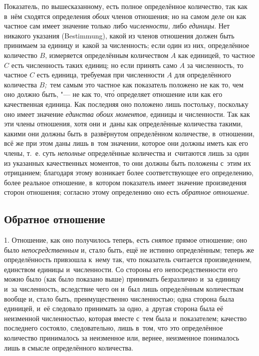 Показатель, по вышесказанному, есть полное определённое количество, так как
в~нём сходятся определения {\em обоих} членов отношения; но на самом деле он
как частное сам имеет значение только либо {\em численности,} либо
{\em единицы}. Нет никакого указания (Bestimmung), какой из членов отношения
должен быть принимаем за единицу и~какой за численность; если один из них,
определённое количество $B$, измеряется определённым количеством $A$ как
единицей, то частное $C$ есть численность таких единиц; но если принять само
$A$ за численность, то частное $C$ есть единица, требуемая при численности $A$
для определённого количества $B${\em ;\,} тем самым это частное как показатель
положено не как то, чем оно должно быть, "--- не как то, чт\'{о} определяет
отношение или как его качественная единица. Как последняя оно положено лишь
постольку, поскольку оно имеет значение {\em единства обоих моментов,} единицы
и численности. Так как эти члены отношения, хотя они и~даны как определённые
количества такими, какими они должны быть в~развёрнутом определённом
количестве, в~отношении, всё же при этом даны лишь в~том значении, которое они
должны иметь как его члены, т.~е. суть {\em неполные} определённые количества
и~считаются лишь за один из указанных качественных моментов, то они должны быть
положены с~этим их отрицанием; благодаря этому возникает более соответствующее
его определению, более реальное отношение, в~котором показатель имеет значение
произведения сторон отношения; согласно этому определению оно есть
{\em обратное отношение}.

\subsection{Обратное отношение}

1. Отношение, как оно получилось теперь, есть {\em снятое} прямое отношение;
оно было {\em непосредственным} и, стало быть, ещё не истинно определённым;
теперь же определённость привзошла к~нему так, что показатель считается
произведением, единством единицы и~численности. Со стороны его
непосредственности его можно было (как было показано выше) принимать
безразлично и~за единицу и~за численность, вследствие чего он и~был лишь
определённым количествам вообще и, стало быть, преимущественно численностью;
одна сторона была единицей, и~её следовало принимать за одно, а~другая сторона
была её неизменной численностью, которая вместе с~тем была и~показателем;
качество последнего состояло, следовательно, лишь в~том, что это определённое
количество принималось за неизменное или, вернее, неизменное понималось лишь в
смысле определённого количества.

